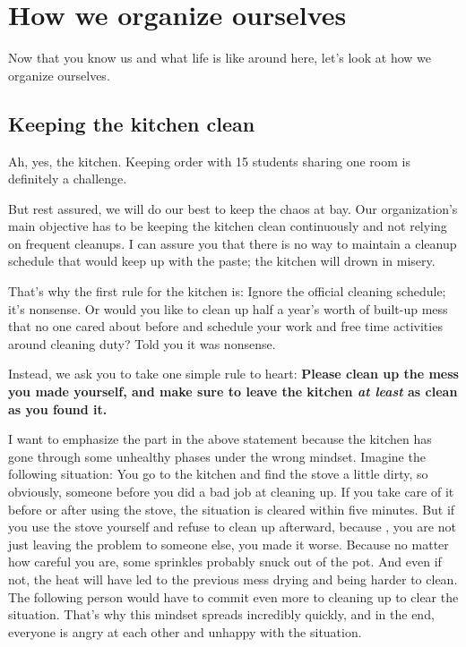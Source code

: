 \chapter{How we organize ourselves} \label{chap:organization}
Now that you know us and what life is like around here, let's look at how we organize ourselves.

\section{Keeping the kitchen clean}
Ah, yes, the kitchen. Keeping order with 15 students sharing one room is definitely a challenge.

But rest assured, we will do our best to keep the chaos at bay. Our organization's main objective has to be keeping the kitchen clean continuously and not relying on frequent cleanups. I can assure you that there is no way to maintain a cleanup schedule that would keep up with the paste; the kitchen will drown in misery.

That's why the first rule for the kitchen is: Ignore the official cleaning schedule; it's nonsense. Or would you like to clean up half a year's worth of built-up mess that no one cared about before and schedule your work and free time activities around cleaning duty? Told you it was nonsense.

Instead, we ask you to take one simple rule to heart: \textbf{Please clean up the mess you made yourself, and make sure to leave the kitchen \textit{at least} as clean as you found it.}

I want to emphasize the  part in the above statement because the kitchen has gone through some unhealthy phases under the wrong mindset. Imagine the following situation: You go to the kitchen and find the stove a little dirty, so obviously, someone before you did a bad job at cleaning up. If you take care of it before or after using the stove, the situation is cleared within five minutes. But if you use the stove yourself and refuse to clean up afterward, because , you are not just leaving the problem to someone else, you made it worse. Because no matter how careful you are, some sprinkles probably snuck out of the pot. And even if not, the heat will have led to the previous mess drying and being harder to clean. The following person would have to commit even more to cleaning up to clear the situation. That's why this mindset spreads incredibly quickly, and in the end, everyone is angry at each other and unhappy with the situation.

